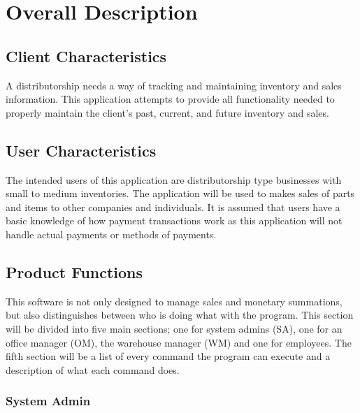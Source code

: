 \documentclass{report}
\begin{document}
\section{Overall Description}

\subsection{Client Characteristics}

A distributorship needs a way of tracking and maintaining inventory and sales information. This application attempts to provide all functionality needed to properly maintain the client's past, current, and future inventory and sales.\par

\subsection{User Characteristics}

The intended users of this application are distributorship type businesses with small to medium inventories. The application will be used to makes sales of parts and items to other companies and individuals. It is assumed that users have a basic knowledge of how payment transactions work as this application will not handle actual payments or methods of payments.\par

\subsection{Product Functions}

This software is not only designed to manage sales and monetary summations, but also distinguishes between who is doing what with the program. This section will be divided into five main sections; one for system admins (SA), one for an office manager (OM), the warehouse manager (WM) and one for employees. The fifth section will be a list of every command the program can execute and a description of what each command does.\par

\subsubsection{System Admin}
\end{document}
